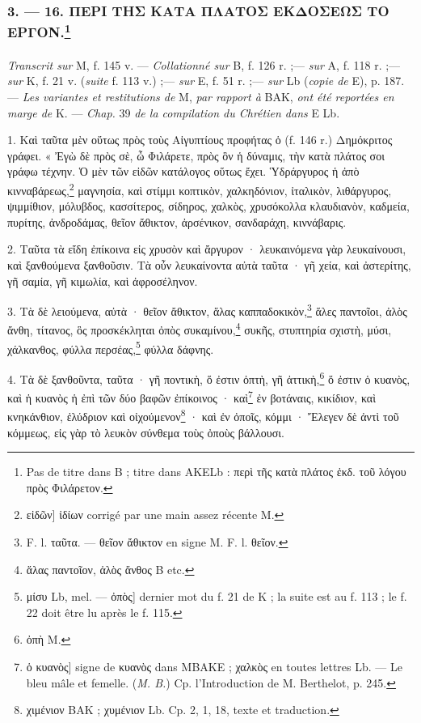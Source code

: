 \documentclass[a4paper, 11pt, oneside, polutonikogreek, french]{article}
\begin{document}
\bigskip
\centerline{\EightStarTaper}
\centerline{\EightStarTaper\EightStarTaper}
\bigskip

\subsubsection[3. --- 16. ΠΕΡΙ ΤΗΣ ΚΑΤΑ ΠΛΑΤΟΣ ΕΚΔΟΣΕΩΣ ΤΟ ΕΡΓΟΝ.]{3. --- 16. ΠΕΡΙ ΤΗΣ ΚΑΤΑ ΠΛΑΤΟΣ ΕΚΔΟΣΕΩΣ ΤΟ ΕΡΓΟΝ.\footnote{Pas de titre dans B ; titre dans AKELb : περὶ τῆς κατὰ πλάτος ἐκδ. τοῦ λόγου πρὸς Φιλάρετον.}}
\paragraph{}
\emph{Transcrit sur} M, f. 145 v. --- \emph{Collationné sur} B, f. 126 r. ;--- \emph{sur} A, f. 118 r. ;--- \emph{sur} K, f. 21 v. (\emph{suite} f. 113 v.) ;--- \emph{sur} E, f. 51 r. ;--- \emph{sur} Lb (\emph{copie de} E), p. 187. --- \emph{Les variantes et restitutions de} M, \emph{par rapport à} BAK, \emph{ont été reportées en marge de} K. --- \emph{Chap.} 39 \emph{de la compilation du Chrétien dans} E Lb.

\bigskip

1. Καὶ ταῦτα μὲν οὕτως πρὸς τοὺς Αἰγυπτίους προφήτας ὁ (f. 146 r.) Δημόκριτος γράφει. « Ἐγὼ δὲ πρὸς σὲ, ὦ Φιλάρετε, πρὸς ὃν ἡ δύναμις, τὴν κατὰ πλάτος σοι γράφω τέχνην. Ὁ μὲν τῶν εἰδῶν κατάλογος οὕτως ἔχει. Ὑδράργυρος ἡ ἀπὸ κινναβάρεως,\footnote{εἰδῶν] ἰδίων corrigé par une main assez récente M.} μαγνησία, καὶ στίμμι κοπτικὸν, χαλκηδόνιον, ἰταλικὸν, λιθάργυρος, ψιμμίθιον, μόλυβδος, κασσίτερος, σίδηρος, χαλκὸς, χρυσόκολλα κλαυδιανὸν, καδμεία, πυρίτης, ἀνδροδάμας, θεῖον ἄθικτον, ἀρσένικον, σανδαράχη, κιννάβαρις.

2. Ταῦτα τὰ εἴδη ἐπίκοινα εἰς χρυσὸν καὶ ἄργυρον · λευκαινόμενα γὰρ λευκαίνουσι, καὶ ξανθούμενα ξανθοῦσιν. Τὰ οὖν λευκαίνοντα αὐτὰ ταῦτα · γῆ χεία, καὶ ἀστερίτης, γῆ σαμία, γῆ κιμωλία, καὶ ἀφροσέληνον.

3. Τὰ δὲ λειούμενα, αὐτὰ · θεῖον ἄθικτον, ἅλας καππαδοκικὸν,\footnote{F. l. ταῦτα. --- θεῖον ἄθικτον en signe M. F. l. θεῖον.} ἅλες παντοῖοι, ἀλὸς ἄνθη, τίτανος, ὃς προσκέκληται ὀπὸς συκαμίνου,\footnote{ἅλας παντοῖον, ἁλὸς ἄνθος B etc.} συκῆς, στυπτηρία σχιστὴ, μύσι, χάλκανθος, φύλλα περσέας,\footnote{μίσυ Lb, mel. --- ὀπὸς] dernier mot du f. 21 de K ; la suite est au f. 113 ; le f. 22 doit être lu après le f. 115.} φύλλα δάφνης.

4. Τὰ δὲ ξανθοῦντα, ταῦτα · γῆ ποντικὴ, ὅ ἐστιν ὀπτὴ, γῆ ἀττικὴ,\footnote{ὀπὴ M.} ὅ ἐστιν ὁ κυανὸς, καὶ ἡ κυανὸς ἡ ἐπὶ τῶν δύο βαφῶν ἐπίκοινος · καὶ\footnote{ὁ κυανὸς] signe de κυανὸς dans MBAKE ; χαλκὸς en toutes lettres Lb. --- Le bleu mâle et femelle. (\emph{M. B.}) Cp. l'Introduction de M. Berthelot, p. 245.} ἐν βοτάναις, κικίδιον, καὶ κνηκάνθιον, ἐλύδριον καὶ οἰχούμενον\footnote{χιμένιον BAΚ ; χυμένιον Lb. Cp. 2, 1, 18, texte et traduction.} · καὶ ἐν ὀποῖς, κόμμι · Ἔλεγεν δὲ ἀντὶ τοῦ κόμμεως, εἰς γὰρ τὸ λευκὸν σύνθεμα τοὺς ὀποὺς βάλλουσι.
\end{document}
